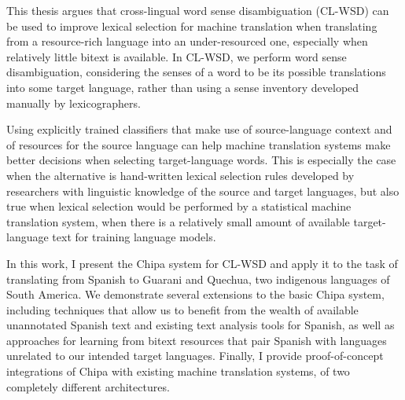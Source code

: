 This thesis argues that cross-lingual word sense disambiguation (CL-WSD) can be
used to improve lexical selection for machine translation when translating from
a resource-rich language into an under-resourced one, especially when relatively
little bitext is available.  In CL-WSD, we perform word sense disambiguation,
considering the senses of a word to be its possible translations into some
target language, rather than using a sense inventory developed manually by
lexicographers.

Using explicitly trained classifiers that make use of source-language context
and of resources for the source language can help machine translation systems
make better decisions when selecting target-language words. This is especially
the case when the alternative is hand-written lexical selection rules developed
by researchers with linguistic knowledge of the source and target languages, but
also true when lexical selection would be performed by a statistical machine
translation system, when there is a relatively small amount of available
target-language text for training language models.

In this work, I present the Chipa system for CL-WSD and apply it to the task of
translating from Spanish to Guarani and Quechua, two indigenous languages of
South America. We demonstrate several extensions to the basic Chipa system,
including techniques that allow us to benefit from the wealth of available
unannotated Spanish text and existing text analysis tools for Spanish, as well
as approaches for learning from bitext resources that pair Spanish with
languages unrelated to our intended target languages. Finally, I provide
proof-of-concept integrations of Chipa with existing machine translation
systems, of two completely different architectures.
